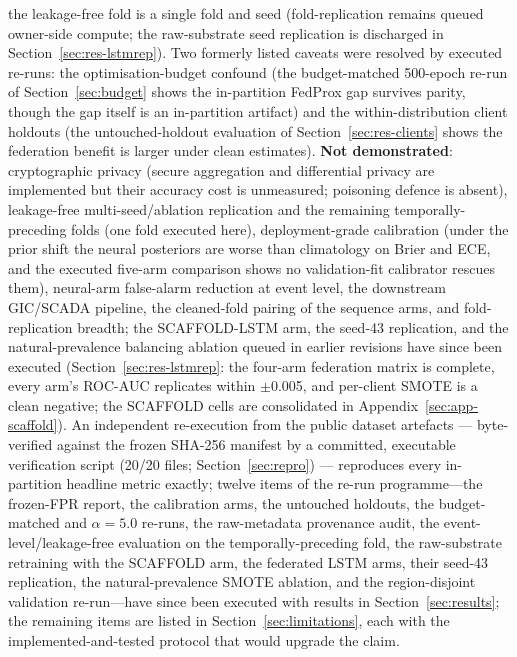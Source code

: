 the leakage-free fold is a single fold and seed (fold-replication
remains queued owner-side compute; the raw-substrate seed
replication is discharged in Section~\ref{sec:res-lstmrep}). Two
formerly listed caveats were resolved by executed re-runs: the
optimisation-budget confound (the budget-matched 500-epoch re-run of
Section~\ref{sec:budget} shows the in-partition FedProx gap survives
parity, though the gap itself is an in-partition artifact) and
the within-distribution client holdouts (the untouched-holdout
evaluation of Section~\ref{sec:res-clients} shows the federation
benefit is larger under clean estimates).
\textbf{Not demonstrated}: cryptographic privacy (secure aggregation
and differential privacy are implemented but their accuracy cost is
unmeasured; poisoning defence is absent), leakage-free
multi-seed/ablation replication and the remaining temporally-preceding
folds (one fold executed here), deployment-grade
calibration (under the prior shift the neural posteriors
are worse than climatology on Brier and ECE, and the executed
five-arm comparison shows no validation-fit calibrator rescues them),
neural-arm false-alarm reduction at event level,
the downstream GIC/SCADA pipeline, the cleaned-fold pairing of the
sequence arms, and fold-replication breadth; the SCAFFOLD-LSTM arm,
the seed-43 replication, and the natural-prevalence balancing
ablation queued in earlier revisions have since been executed
(Section~\ref{sec:res-lstmrep}: the four-arm federation matrix is
complete, every arm's ROC-AUC replicates within $\pm$0.005, and
per-client SMOTE is a clean negative; the SCAFFOLD cells are
consolidated in Appendix~\ref{sec:app-scaffold}).
An independent re-execution from the public dataset artefacts ---
byte-verified against the frozen SHA-256 manifest by a committed,
executable verification script (20/20 files; Section~\ref{sec:repro})
--- reproduces every in-partition headline metric exactly; twelve items of the re-run
programme---the frozen-FPR report, the calibration arms, the
untouched holdouts, the budget-matched and $\alpha{=}5.0$ re-runs,
the raw-metadata provenance audit, the event-level/leakage-free
evaluation on the temporally-preceding fold, the raw-substrate
retraining with the SCAFFOLD arm, the federated LSTM arms, their
seed-43 replication, the natural-prevalence SMOTE
ablation, and the region-disjoint validation re-run---have
since been executed with results in Section~\ref{sec:results}; the
remaining
items are listed in
Section~\ref{sec:limitations}, each with the implemented-and-tested
protocol that would upgrade the claim.

